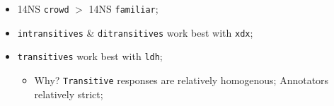\documentclass[xcolor={dvipsnames}]{beamer}
\newcommand{\param}[1]{\texttt{#1}}
\begin{document}
\begin{frame}
\pause
\begin{itemize}
\item 14NS \param{crowd} $>$ 14NS \param{familiar};
\pause
\item \param{intransitives} \& \param{ditransitives} work best with \param{xdx};
\pause
\item \param{transitives} work best with \param{ldh};
\begin{itemize}
\pause
\item Why? \param{Transitive} responses are relatively homogenous; Annotators relatively strict;
\end{itemize}
\end{itemize}

\end{frame}

\end{document}
